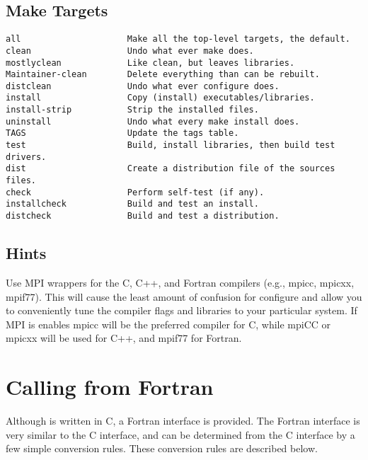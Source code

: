 \subsection{Make Targets}

\begin{ttfamily}
\begin{mdseries}
\begin{verbatim}
all                     Make all the top-level targets, the default.
clean                   Undo what ever make does.
mostlyclean             Like clean, but leaves libraries.
Maintainer-clean        Delete everything than can be rebuilt.
distclean               Undo what ever configure does.
install                 Copy (install) executables/libraries.
install-strip           Strip the installed files.
uninstall               Undo what every make install does.
TAGS                    Update the tags table.
test                    Build, install libraries, then build test drivers.
dist                    Create a distribution file of the sources files.
check                   Perform self-test (if any).
installcheck            Build and test an install.
distcheck               Build and test a distribution.
\end{verbatim}
\end{mdseries}
\end{ttfamily}

\subsection{Hints}

Use MPI wrappers for the C, C++, and Fortran compilers (e.g.,
mpicc, mpicxx, mpif77).  This will cause the least amount of 
confusion for configure and allow you to conveniently tune the 
compiler flags and libraries to your particular system. If MPI 
is enables mpicc will be the preferred compiler for C, while 
mpiCC or mpicxx will be used for C++, and mpif77 for Fortran.


\section{Calling from Fortran}
\label{Calling from Fortran}

Although \hypre{} is written in C, a Fortran interface is provided.
The Fortran interface is very similar to the C interface, and can be
determined from the C interface by a few simple conversion rules.
These conversion rules are described below.

